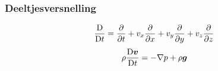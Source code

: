 \documentclass[t]{beamer}
\begin{document}
	\begin{frame}
		\frametitle{Deeltjesversnelling}
		\vspace{1cm}
		\begin{equation}
			\frac{\mathrm{D}}{\mathrm{D} t} = \frac{\partial}{\partial t} + v_x \frac{\partial}{\partial x} + v_y \frac{\partial}{\partial y} + v_z \frac{\partial}{\partial z}
		\end{equation}
		\pause
		\vspace{1cm}
		\begin{equation}
			\rho \frac{\mathrm{D} \boldsymbol{v}}{\mathrm{D} t} = -\nabla p + \rho \boldsymbol{g}
		\end{equation}
  	\end{frame}
\end{document}
